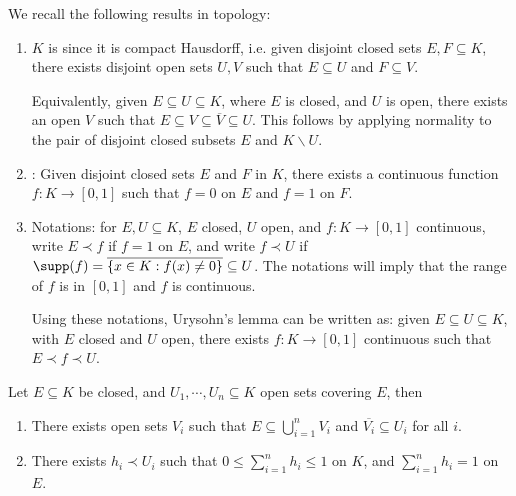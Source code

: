 \documentclass[a4paper]{article}
\begin{document}
We recall the following results in topology:
\begin{enumerate}
	\item $K$ is  since it is compact Hausdorff, i.e. given disjoint closed sets $E,F\subseteq K$, there exists disjoint open sets $U,V$ such that $E\subseteq U$ and $F\subseteq V$.

	Equivalently, given $E\subseteq U\subseteq K$, where $E$ is closed, and $U$ is open, there exists an open $V$ such that $E\subseteq V\subseteq\overline{V}\subseteq U$. This follows by applying normality to the pair of disjoint closed subsets $E$ and $K\backslash U$.
	\item {}: Given disjoint closed sets $E$ and $F$ in $K$, there exists a continuous function $f:K\to[0,1]$ such that $f=0$ on $E$ and $f=1$ on $F$.
	\item Notations: for $E,U\subseteq K$, $E$ closed, $U$ open, and $f:K\to [0,1]$ continuous, write $E\prec f$ if $f=1$ on $E$, and write $f\prec U$ if $\supp(f)=\overline{\{x\in K:f(x)\not= 0\}}\subseteq U$. The notations will imply that the range of $f$ is in $[0,1]$ and $f$ is continuous.

	 Using these notations, Urysohn's lemma can be written as: given $E\subseteq U\subseteq K$, with $E$ closed and $U$ open, there exists $f:K\to[0,1]$ continuous such that $E\prec f\prec U$.
\end{enumerate}

\begin{nlemma}\label{lem:PartitionUnity}
	Let $E\subseteq K$ be closed, and $U_1,\cdots,U_n\subseteq K$ open sets covering $E$, then
	\begin{enumerate}[label=(\roman*)]
		\item There exists open sets $V_i$ such that $E\subseteq\bigcup_{i=1}^n V_i$ and $\overline{V_i}\subseteq U_i$ for all $i$.
		\item There exists $h_i\prec U_i$ such that $0\leq\sum_{i=1}^n h_i\leq 1$ on $K$, and $\sum_{i=1}^n h_i=1$ on $E$.
	\end{enumerate}
\end{nlemma}
\end{document}

